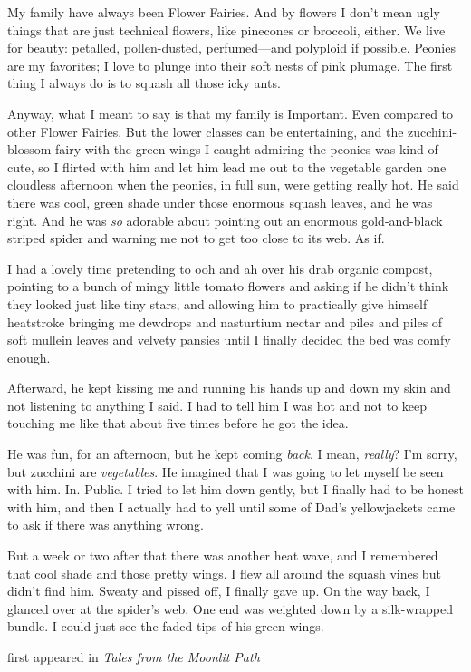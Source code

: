 
My family have always been Flower Fairies. And by flowers I don't mean
ugly things that are just technical flowers, like pinecones or broccoli,
either. We live for beauty: petalled, pollen-dusted, perfumed---and
polyploid if possible. Peonies are my favorites; I love to plunge into
their soft nests of pink plumage. The first thing I always do is to
squash all those icky ants.

Anyway, what I meant to say is that my family is Important. Even
compared to other Flower Fairies. But the lower classes can be
entertaining, and the zucchini-blossom fairy with the green wings I
caught admiring the peonies was kind of cute, so I flirted with him and
let him lead me out to the vegetable garden one cloudless afternoon when
the peonies, in full sun, were getting really hot. He said there was
cool, green shade under those enormous squash leaves, and he was right.
And he was \emph{so} adorable about pointing out an enormous
gold-and-black striped spider and warning me not to get too close to its
web. As if.

I had a lovely time pretending to ooh and ah over his drab organic
compost, pointing to a bunch of mingy little tomato flowers and asking
if he didn't think they looked just like tiny stars, and allowing him to
practically give himself heatstroke bringing me dewdrops and nasturtium
nectar and piles and piles of soft mullein leaves and velvety pansies
until I finally decided the bed was comfy enough.

Afterward, he kept kissing me and running his hands up and down my skin
and not listening to anything I said. I had to tell him I was hot and
not to keep touching me like that about five times before he got the
idea.

He was fun, for an afternoon, but he kept coming \emph{back}. I mean,
\emph{really}? I'm sorry, but zucchini are \emph{vegetables}. He
imagined that I was going to let myself be seen with him. In. Public. I
tried to let him down gently, but I finally had to be honest with him,
and then I actually had to yell until some of Dad's yellowjackets came
to ask if there was anything wrong.

But a week or two after that there was another heat wave, and I
remembered that cool shade and those pretty wings. I flew all around the
squash vines but didn't find him. Sweaty and pissed off, I finally gave
up. On the way back, I glanced over at the spider's web. One end was
weighted down by a silk-wrapped bundle. I could just see the faded tips
of his green wings.

first appeared in \emph{Tales from the Moonlit Path}
